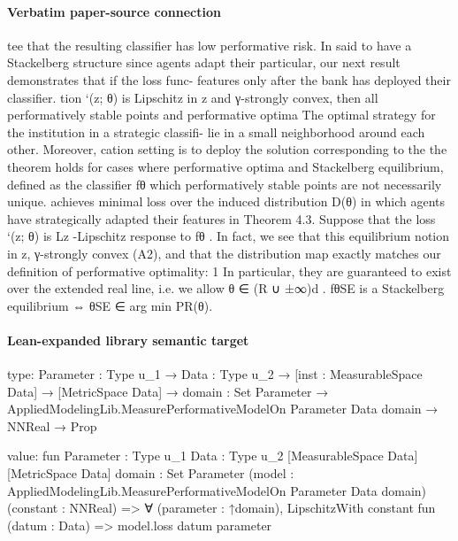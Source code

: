 \documentclass[10pt]{article}
\begin{document}
\paragraph{Verbatim paper-source connection}
\begin{ReviewVerbatim}
tee that the resulting classiﬁer has low performative risk. In        said to have a Stackelberg structure since agents adapt their
particular, our next result demonstrates that if the loss func-       features only after the bank has deployed their classiﬁer.
tion `(z; θ) is Lipschitz in z and γ-strongly convex, then
all performatively stable points and performative optima              The optimal strategy for the institution in a strategic classiﬁ-
lie in a small neighborhood around each other. Moreover,              cation setting is to deploy the solution corresponding to the
the theorem holds for cases where performative optima and             Stackelberg equilibrium, deﬁned as the classiﬁer fθ which
performatively stable points are not necessarily unique.              achieves minimal loss over the induced distribution D(θ)
                                                                      in which agents have strategically adapted their features in
Theorem 4.3. Suppose that the loss `(z; θ) is Lz -Lipschitz           response to fθ . In fact, we see that this equilibrium notion
in z, γ-strongly convex (A2), and that the distribution map           exactly matches our deﬁnition of performative optimality:
    1
      In particular, they are guaranteed to exist over the extended
real line, i.e. we allow θ ∈ (R ∪ {±∞})d .                            fθSE is a Stackelberg equilibrium ⇔ θSE ∈ arg min PR(θ).
\end{ReviewVerbatim}



\paragraph{Lean-expanded library semantic target}
\begin{ReviewVerbatim}
type:
{Parameter : Type u_1} →
  {Data : Type u_2} →
    [inst : MeasurableSpace Data] →
      [MetricSpace Data] →
        {domain : Set Parameter} → AppliedModelingLib.MeasurePerformativeModelOn Parameter Data domain → NNReal → Prop

value:
fun {Parameter : Type u_1} {Data : Type u_2} [MeasurableSpace Data] [MetricSpace Data] {domain : Set Parameter}
    (model : AppliedModelingLib.MeasurePerformativeModelOn Parameter Data domain) (constant : NNReal) =>
  ∀ (parameter : ↑domain), LipschitzWith constant fun (datum : Data) => model.loss datum parameter
\end{ReviewVerbatim}
\end{document}
